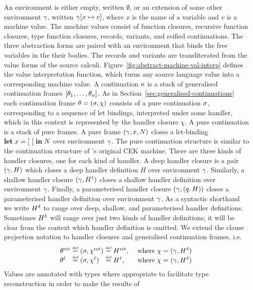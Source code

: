 \documentclass[12pt,phd,lfcs,twoside,openright,logo,leftchapter,normalheadings]{infthesis}
\theoremstyle{plain}
\theoremstyle{definition}
\begin{document}
An environment is either empty, written $\emptyset$, or an extension
of some other environment $\gamma$, written $\gamma[x \mapsto v]$, where
$x$ is the name of a variable and $v$ is a machine value.
%
The machine values consist of function closures, recursive function
closures, type function closures, records, variants, and reified
continuations. The three abstraction forms are paired with an
environment that binds the free variables in the their bodies. The
records and variants are transliterated from the value forms of the
source calculi. Figure~\ref{fig:abstract-machine-val-interp} defines
the value interpretation function, which turns any source language
value into a corresponding machine value.
%
A continuation $\kappa$ is a stack of generalised continuation frames
$[\theta_1, \dots, \theta_n]$. As in
Section~\ref{sec:generalised-continuations} each continuation frame
$\theta = (\sigma, \chi)$ consists of a pure continuation $\sigma$,
corresponding to a sequence of let bindings, interpreted under some
handler, which in this context is represented by the handler closure
$\chi$.
%
A pure continuation is a stack of pure frames. A pure frame
$(\gamma, x, N)$ closes a let-binding $\mathbf{let} \;x=[~] \;\mathbf{in}\;N$ over
environment $\gamma$. The pure continuation structure is similar to the
continuation structure of \citeauthor{FelleisenF86}'s original CEK
machine.
%
There are three kinds of handler closures, one for each kind of
handler. A deep handler closure is a pair $(\gamma, H)$ which closes a
deep handler definition $H$ over environment $\gamma$. Similarly, a
shallow handler closure $(\gamma, H^\dagger)$ closes a shallow handler
definition over environment $\gamma$. Finally, a parameterised handler
closure $(\gamma, (q.\,H))$ closes a parameterised handler definition
over environment $\gamma$. As a syntactic shorthand we write $H^\delta$
to range over deep, shallow, and parameterised handler
definitions. Sometimes $H^\delta$ will range over just two kinds of
handler definitions; it will be clear from the context which handler
definition is omitted.
%
We extend the clause projection notation to handler closures and
generalised continuation frames, i.e.
%
\[
  \ba{@{~}l@{~}c@{~}l@{~}c@{~}l@{~}l}
  \theta^{\mathrm{ret}} &\defas& (\sigma, \chi^{\mathrm{ret}}) &\defas& \hret, &\quad \text{where } \chi = (\env, H^\depth)\\
    \theta^{\ell}     &\defas& (\sigma, \chi^{\ell}) &\defas& \hell, &\quad \text{where } \chi = (\env, H^\depth)
  \el
\]
%
Values are annotated with types where appropriate to facilitate type
reconstruction in order to make the results of
\end{document}
